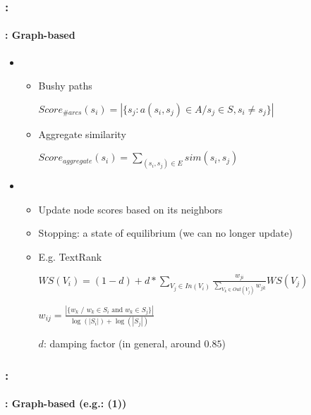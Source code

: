 \documentclass[xcolor=table]{beamer}
\begin{document}
\begin{frame}
	\frametitle{\insertshortsubtitle: \insertsection}
	\framesubtitle{\insertsubsection: Graph-based}
	
	\begin{itemize}
		\item {}
		\begin{itemize}
			\item Bushy paths 
			
			\hspace{.5cm}$Score_{\#arcs}(s_i) = |\{ s_j : a(s_i, s_j) \in A / s_j \in S, s_i \neq s_j \}|$
			
			\item Aggregate similarity
			
			\hspace{.5cm}$Score_{aggregate}(s_i) = \sum\limits_{(s_i, s_j) \in E} sim(s_i, s_j)$
		\end{itemize}
		\item {}
		\begin{itemize}
			\item Update node scores based on its neighbors
			\item Stopping: a state of equilibrium (we can no longer update)
			\item E.g. TextRank \cite{04-mihalcea-tarau}
			
			$WS(V_i) = ( 1 - d) + d * \sum\limits_{V_j \in In(V_i)} \frac{w_{ji}}{\sum\limits_{V_k \in Out(V_j)} w_{jk}} WS(V_j)$
			
			$w_{ij} = \frac{|\{w_k \text{ / } w_k \in S_i \text{ and } w_k \in S_j\}|}{\log(|S_i|) + \log(|S_j|)}$
			
			$ d $: damping factor (in general, around $ 0.85 $)
		\end{itemize}
	\end{itemize}

\end{frame}

\begin{frame}
	\frametitle{\insertshortsubtitle: \insertsection}
	\framesubtitle{\insertsubsection: Graph-based (e.g.: \cite{21-aries-al} (1))}
	
	\begin{center}
	\end{center}
	
\end{frame}
\end{document}
